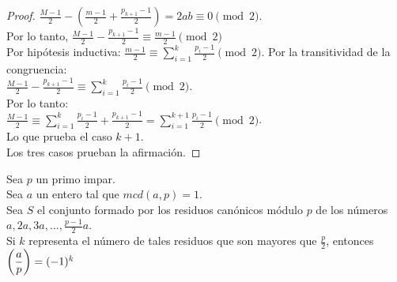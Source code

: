 \begin{proof}
$\frac{M-1}{2}-\left(\frac{m-1}{2}+\frac{p_{k+1}-1}{2}\right)=2ab\equiv 0\pmod 2$. \\
Por lo tanto, $\frac{M-1}{2}-\frac{p_{k+1}-1}{2} \equiv \frac{m-1}{2} \pmod 2$\\
Por hipótesis inductiva: $\frac{m-1}{2}\equiv \sum_{i=1}^k \frac{p_i-1}{2}\pmod 2$.
Por la transitividad de la congruencia: \\
$\frac{M-1}{2}-\frac{p_{k+1}-1}{2} \equiv \sum_{i=1}^k \frac{p_i-1}{2}\pmod 2$. \\
Por lo tanto: \\
$\frac{M-1}{2} \equiv \sum_{i=1}^k \frac{p_i-1}{2}+\frac{p_{k+1}-1}{2} =\sum_{i=1}^{k+1}\frac{p_i-1}{2}\pmod 2$. \\
Lo que prueba el caso $k+1$. \\
Los tres casos prueban la afirmación.
\end{proof}

\begin{enunciado}\label{enun:lemaGauss}\leavevmode\par
Sea $p$ un primo impar. \\
Sea $a$ un entero tal que $mcd(a,p)=1$. \\
Sea $S$ el conjunto formado por los residuos canónicos módulo $p$ de los números $a, 2a, 3a, \dots, \frac{p-1}{2}a$. \\
Si $k$ representa el número de tales residuos que son mayores que $\frac{p}{2}$, entonces $\left(\dfrac{a}{p}\right) = (-1)^{k}$
\end{enunciado}

